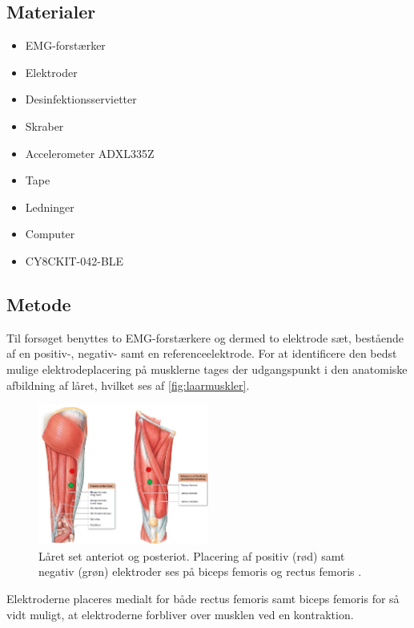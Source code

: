 \subsection{Materialer} 
\begin{itemize}
\item EMG-forstærker
\item Elektroder 
\item Desinfektionsservietter
\item Skraber
\item Accelerometer ADXL335Z
\item Tape
\item Ledninger 
\item Computer
\item CY8CKIT-042-BLE 
\end{itemize}

\subsection{Metode}
Til forsøget benyttes to EMG-forstærkere og dermed to elektrode sæt, bestående af en positiv-, negativ- samt en referenceelektrode.
For at identificere den bedst mulige elektrodeplacering på musklerne tages der udgangspunkt i den anatomiske afbildning af låret, hvilket ses af \autoref{fig:laarmuskler}.

\begin{figure}[H]
\centering
\includegraphics[width=0.5\textwidth]{figures/laarmuskler.png}
\caption{Låret set anteriot og posteriot. Placering af positiv (rød) samt negativ (grøn) elektroder ses på biceps femoris og rectus femoris \citep{martini2012}.}
\label{fig:laarmuskler}
\end{figure}

Elektroderne placeres medialt for både rectus femoris samt biceps femoris for så vidt muligt, at elektroderne forbliver over musklen ved en kontraktion. 

